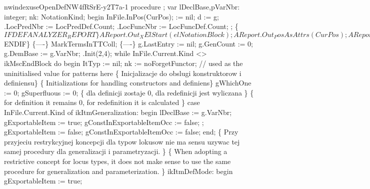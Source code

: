 nwindexuse{}{OpenDef}{NW4fRSrE-y2T7a-1}\nwendcode{}\nwdocspar
\nwenddocs{}\endmoddef\nwstartdeflinemarkup{}\nwenddeflinemarkup
procedure ;
var
   lDeclBase,pVarNbr: integer;
   nk: NotationKind;
begin
   InFile.InPos(CurPos);
    := nil;
   d := g;
   .LocPredNbr := LocPredDef.Count;
   .LocFuncNbr := LocFuncDef.Count;
   ;
   \{$IFDEF ANALYZER_REPORT\}
   AReport.Out_XElStart(elNotationBlock);
   AReport.Out_PosAsAttrs(CurPos);
   AReport.Out_XAttrEnd;
   \{$ENDIF\}
   \{----\}
   MarkTermsInTTColl;
   \{----\}
   g.LastEntry := nil;
   g.GenCount := 0;
   g.DemBase := g.VarNbr;
   .Init(2,4);
   while InFile.Current.Kind <> ikMscEndBlock do
   begin
      ItTyp := nil;
      nk := noForgetFunctor; // used as the uninitialised value for patterns here
      \{ Inicjalizacje do obslugi konstruktorow i definiensu\}
      \{ Initializations for handling constructors and definiens\}
      gWhichOne := 0;
      gSuperfluous := 0; \{ dla definicji zostaje 0, dla redefinicji jest wyliczana \}
                         \{ for definition it remains 0, for redefinition it is calculated \}
      case InFile.Current.Kind of
         ikItmGeneralization:
            begin lDeclBase := g.VarNbr;
            gExportableItem := true;
            gConstInExportableItemOcc := false;
            ;
            gExportableItem := false;
            gConstInExportableItemOcc := false;
            end;
         \{ Przy przyjeciu restrykcyjnej koncepcji dla typow lokusow nie ma sensu
           uzywac tej samej procedury dla generalizacji i parametryzacji.
         \}
         \{ When adopting a restrictive concept for locus types, it does not make sense
           to use the same procedure for generalization and parameterization. \}
         ikItmDefMode:
            begin
               gExportableItem := true;
